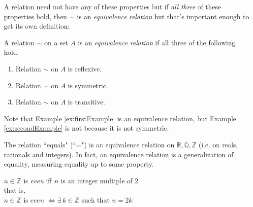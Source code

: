 A relation need not have any of these properties but if \textit{all three} of these properties hold, then $\sim$ is an \textit{equivalence relation} but that's important enough to get its own definition:
\begin{definition}
A relation $\sim$ on a set $A$ is an \textit{equivalence relation} if all three of the following hold:
\begin{enumerate}[label=\roman*)]
    \item Relation $\sim$ on $A$ is reflexive.
    \item Relation $\sim$ on $A$ is symmetric.
    \item Relation $\sim$ on $A$ is transitive.
\end{enumerate}
\end{definition}
Note that Example \ref{ex:firstExample} is an equivalence relation, but Example \ref{ex:secondExample} is not because it is not symmetric.
\newpage
\begin{example}
The relation ``equals" (``=") is an equivalence relation on $\mathbb{R}, \mathbb{Q}, \mathbb{Z}$ (i.e. on reals, rationals and integers). In fact, an equivalence relation is a generalization of equality, measuring equality up to some property.
\end{example}
\begin{definition}[Even]
$n\in \mathbb{Z}$ is \textit{even} iff $n$ is an integer multiple of $2$ \\
that is, \\
$n\in \mathbb{Z} \text{ is}\textit{ even }\Leftrightarrow \exists \ k \in \mathbb{Z}$ such that $n=2k$
\end{definition}

